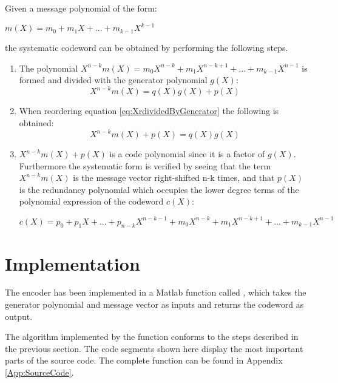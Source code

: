 \documentclass[Main]{subfiles}
\begin{document}
Given a message polynomial of the form:

{\centering 
$m(X) = m_0 + m_1X + ... + m_{k-1}X^{k-1}$ \par}

the systematic codeword can be obtained by performing the following steps.

\begin{enumerate}
\item The polynomial $X^{n-k}m(X) = m_0X^{n-k} + m_1X^{n-k+1} + ... +m_{k-1}X^{n-1}$ is formed and divided with the generator polynomial $g(X)$:
\begin{equation} \label{eq:XrdividedByGenerator}
X^{n-k}m(X) = q(X)g(X)+p(X)
\end{equation}

\item When reordering equation \ref{eq:XrdividedByGenerator} the following is obtained:
\begin{equation} \label{eq:XrdividedByGeneratorReoreded}
X^{n-k}m(X)+ p(X)=q(X)g(X)
\end{equation}

\item $X^{n-k}m(X)+p(X)$ is a code polynomial since it is a factor of $g(X)$. Furthermore the systematic form is verified by seeing that the term $X^{n-k}m(X)$ is the message vector right-shifted n-k times, and that $p(X)$ is the redundancy polynomial which occupies the lower degree terms of the polynomial expression of the codeword $c(X)$:

{\centering 
$c(X) = p_0 + p_1X + ... + p_{n-k}X^{n-k-1} + m_0X^{n-k} + m_1X^{n-k+1}+...+m_{k-1}X^{n-1}$ \par}

\end{enumerate}

\section{Implementation} \label{sec:EncImpl}
The encoder has been implemented in a Matlab function called  , which takes the generator polynomial and message vector as inputs and returns the codeword as output.

The algorithm implemented by the function conforms to the steps described in the previous section. The code segments shown here display the most important parts of the source code. The complete function can be found in Appendix \ref{App:SourceCode}. 
\end{document}
